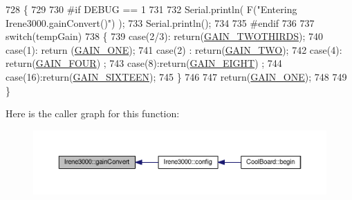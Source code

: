 \begin{DoxyCode}
728 \{
729 
730 \textcolor{preprocessor}{#if DEBUG == 1 }
731 
732     Serial.println( F(\textcolor{stringliteral}{"Entering Irene3000.gainConvert()"}) );
733     Serial.println();
734 
735 \textcolor{preprocessor}{#endif }
736     
737     \textcolor{keywordflow}{switch}(tempGain)
738     \{
739         \textcolor{keywordflow}{case}(2/3): \textcolor{keywordflow}{return}(\hyperlink{_cool_adafruit___a_d_s1015_8h_a3d6c0e15829a207b9155890811fa4781a879d688347ec0bf159fe1278db602f68}{GAIN\_TWOTHIRDS});
740         \textcolor{keywordflow}{case}(1): \textcolor{keywordflow}{return} (\hyperlink{_cool_adafruit___a_d_s1015_8h_a3d6c0e15829a207b9155890811fa4781ab6b0b520637e016e297110bebeb23a54}{GAIN\_ONE});
741         \textcolor{keywordflow}{case}(2) : \textcolor{keywordflow}{return}(\hyperlink{_cool_adafruit___a_d_s1015_8h_a3d6c0e15829a207b9155890811fa4781a447f66a13d0dfbe92462e35f1307cc0d}{GAIN\_TWO});
742         \textcolor{keywordflow}{case}(4): \textcolor{keywordflow}{return}(\hyperlink{_cool_adafruit___a_d_s1015_8h_a3d6c0e15829a207b9155890811fa4781a33fa5521f4e806b7438052fcdbbf8660}{GAIN\_FOUR}) ;   
743         \textcolor{keywordflow}{case}(8):\textcolor{keywordflow}{return}(\hyperlink{_cool_adafruit___a_d_s1015_8h_a3d6c0e15829a207b9155890811fa4781af284da818fc21db27c5ffcfaff7047cb}{GAIN\_EIGHT})  ;  
744         \textcolor{keywordflow}{case}(16):\textcolor{keywordflow}{return}(\hyperlink{_cool_adafruit___a_d_s1015_8h_a3d6c0e15829a207b9155890811fa4781a08fc581748aedabe657bb8aa9464d734}{GAIN\_SIXTEEN});  
745     \}
746 
747     \textcolor{keywordflow}{return}(\hyperlink{_cool_adafruit___a_d_s1015_8h_a3d6c0e15829a207b9155890811fa4781ab6b0b520637e016e297110bebeb23a54}{GAIN\_ONE});
748 
749 \}
\end{DoxyCode}
Here is the caller graph for this function\+:\nopagebreak
\begin{figure}[H]
\begin{center}
\leavevmode
\includegraphics[width=350pt]{d6/d03/class_irene3000_abcad62d1201a59f8dd3ba87048002728_icgraph}
\end{center}
\end{figure}
\mbox{\label{class_irene3000_a7bc2414100b5e19eacc6630fa34b2654}} 
